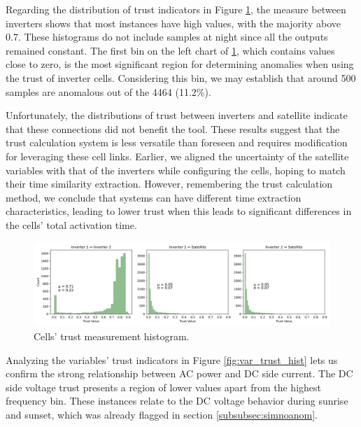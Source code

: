 Regarding the distribution of trust indicators in Figure \ref{fig:cell_trust_hist}, the measure between inverters shows that most instances have high values, with the majority above 0.7. These histograms do not include samples at night since all the outputs remained constant. The first bin on the left chart of \ref{fig:cell_trust_hist}, which contains values close to zero, is the most significant region for determining anomalies when using the trust of inverter cells. Considering this bin, we may establish that around 500 samples are anomalous out of the 4464 (11.2\%).

Unfortunately, the distributions of trust between inverters and satellite indicate that these connections did not benefit the tool. These results suggest that the trust calculation system is less versatile than foreseen and requires modification for leveraging these cell links. Earlier, we aligned the uncertainty of the satellite variables with that of the inverters while configuring the cells, hoping to match their time similarity extraction. However, remembering the trust calculation method, we conclude that systems can have different time extraction characteristics, leading to lower trust when this leads to significant differences in the cells' total activation time.

\begin{figure}[h!]
    \centering
    \includegraphics[width=\textwidth]{figures/chapter5/results/real/50_hist_trust_cells-1.png}
    \caption{Cells' trust measurement histogram.}
    \label{fig:cell_trust_hist}
\end{figure}

Analyzing the variables' trust indicators in Figure \ref{fig:var_trust_hist} lets us confirm the strong relationship between AC power and DC side current. The DC side voltage trust presents a region of lower values apart from the highest frequency bin. These instances relate to the DC voltage behavior during sunrise and sunset, which was already flagged in section \ref{subsubsec:simnoanom}.

